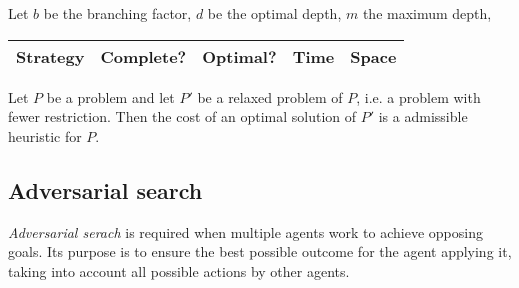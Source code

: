 \documentclass{article}
\begin{document}
Let $b$ be the branching factor, $d$ be the optimal depth, $m$ the maximum depth, 


\begin{center}
    \begin{tabular}{l | l | l | l | l}
        \textbf{Strategy} & \textbf{Complete?} & \textbf{Optimal?} & \textbf{Time} & \textbf{Space}
        \\\hline
    \end{tabular}
\end{center}

\begin{theorem}
    Let $P$ be a problem and let $P'$ be a relaxed problem of $P$, i.e.
    a problem with fewer restriction. Then the cost of an optimal solution of 
    $P'$ is a admissible heuristic for $P$.
\end{theorem}


\subsection{Adversarial search}


\begin{definition}
    \emph{Adversarial serach} is required when multiple agents work to achieve 
    opposing goals. Its purpose is to ensure the best possible outcome for the
    agent applying it, taking into account all possible actions by other agents.
\end{definition}
\end{document}
